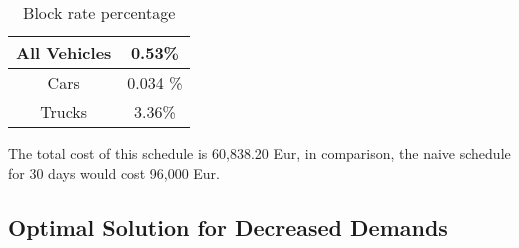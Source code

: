 \begin{table}
	\centering
	\begin{tabular}{|c|c|}
		\hline
		All Vehicles & 0.53\% \\ \hline
		Cars & 0.034 \% \\ \hline
		Trucks & 3.36\% \\ \hline
	\end{tabular}
	\caption{Block rate percentage}
	\label{tab:block}
\end{table}

The total cost of this schedule is 60,838.20 Eur, in comparison, the naive schedule for 30 days would cost 96,000 Eur.


\subsection{Optimal Solution for Decreased Demands}